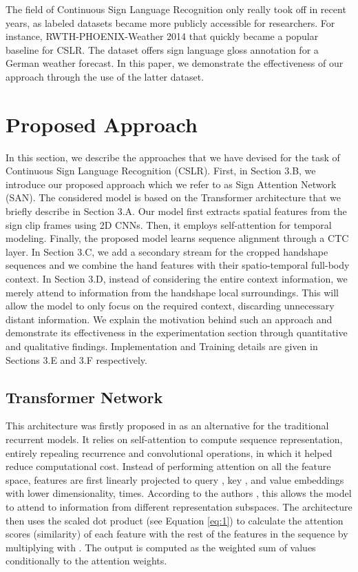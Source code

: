 \documentclass[a4paper,conference]{IEEEtran}
\begin{document}
The field of Continuous Sign Language Recognition only really took off in recent years, as labeled datasets became more publicly accessible for researchers. For instance, RWTH-PHOENIX-Weather 2014 \cite{koller2015continuous} that quickly became a popular baseline for CSLR. The dataset offers sign language gloss annotation for a German weather forecast. In this paper, we demonstrate the effectiveness of our approach through the use of the latter dataset.	


	
\section{Proposed Approach}

In this section, we describe the approaches that we have devised for the task of Continuous Sign Language Recognition (CSLR). First, in Section 3.B, we introduce our proposed approach which we refer to as Sign Attention Network (SAN). The considered model is based on the Transformer architecture that we briefly describe in Section 3.A. Our model first extracts spatial features from the sign clip frames using 2D CNNs. Then, it employs self-attention for temporal modeling. Finally, the proposed model learns sequence alignment through a CTC layer. In Section 3.C, we add a secondary stream for the cropped handshape sequences and we combine the hand features with their spatio-temporal full-body context. In Section 3.D, instead of considering the entire context information, we merely attend to information from the handshape local surroundings. This will allow the model to only focus on the required context, discarding unnecessary distant information. We explain the motivation behind such an approach and demonstrate its effectiveness in the experimentation section through quantitative and qualitative findings. Implementation and Training details are given in Sections 3.E and 3.F respectively.


\subsection{Transformer Network}
	
This architecture was firstly proposed in \cite{vaswani2017attention} as an alternative for the traditional recurrent models. It relies on self-attention to compute sequence representation, entirely repealing recurrence and convolutional operations, in which it helped reduce computational cost. Instead of performing attention on all the feature space, features are first linearly projected to query , key , and value  embeddings with lower dimensionality,  times. According to the authors \cite{vaswani2017attention}, this allows the model to attend to information from different representation subspaces. The architecture then uses the scaled dot product (see Equation \ref{eq:1}) to calculate the attention scores (similarity) of each feature with the rest of the features in the sequence by multiplying  with . The output is computed as the weighted sum of values  conditionally to the attention weights. 
	
\end{document}

